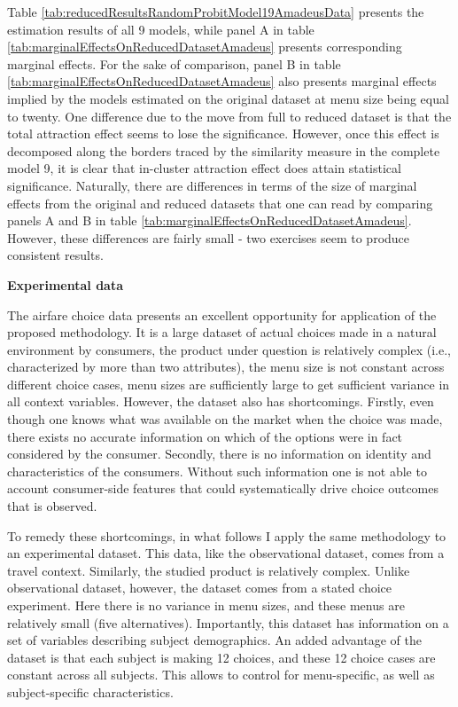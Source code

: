 \documentclass[a4paper,12pt]{article}
\begin{document}
Table \ref{tab:reducedResultsRandomProbitModel19AmadeusData} presents the estimation results of all 9 models, while panel A in table \ref{tab:marginalEffectsOnReducedDatasetAmadeus} presents corresponding marginal effects. For the sake of comparison, panel B in table \ref{tab:marginalEffectsOnReducedDatasetAmadeus} also presents marginal effects implied by the models estimated on the original dataset at menu size being equal to twenty. One difference due to the move from full to reduced dataset is that the total attraction effect seems to lose the significance. However, once this effect is decomposed along the borders traced by the similarity measure in the complete model 9, it is clear that in-cluster attraction effect does attain statistical significance. Naturally, there are differences in terms of the size of marginal effects from the original and reduced datasets that one can read by comparing panels A and B in table \ref{tab:marginalEffectsOnReducedDatasetAmadeus}. However, these differences are fairly small - two exercises seem to produce consistent results.

\textbf{Experimental data}

The airfare choice data presents an excellent opportunity for application of the proposed methodology. It is a large dataset of actual choices made in a natural environment by consumers, the product under question is relatively complex (i.e., characterized by more than two attributes), the menu size is not constant across different choice cases, menu sizes are sufficiently large to get sufficient variance in all context variables. However, the dataset also has shortcomings. Firstly, even though one knows what was available on the market when the choice was made, there exists no accurate information on which of the options were in fact considered by the consumer. Secondly, there is no information on identity and characteristics of the consumers. Without such information one is not able to account consumer-side features that could systematically drive choice outcomes that is observed.

To remedy these shortcomings, in what follows I apply the same methodology to an experimental dataset. This data, like the observational dataset, comes from a travel context. Similarly, the studied product is relatively complex. Unlike observational dataset, however, the dataset comes from a stated choice experiment. Here there is no variance in menu sizes, and these menus are relatively small (five alternatives). Importantly, this dataset has information on a set of variables describing subject demographics. An added advantage of the dataset is that each subject is making 12 choices, and these 12 choice cases are constant across all subjects. This allows to control for menu-specific, as well as subject-specific characteristics.
\end{document}
